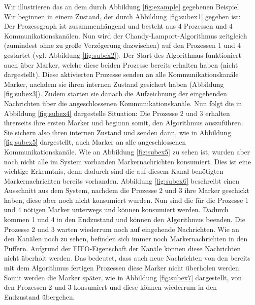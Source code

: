 \documentclass[a4paper,
12pt,
BCOR12mm,
]{scrartcl}
\theoremstyle{break}
\begin{document}
Wir illustrieren das an dem durch Abbildung \ref{fig:example} gegebenen Beispiel. Wir
beginnen in einem Zustand, der durch Abbildung \ref{fig:subex1} gegeben ist: Der
Prozessgraph ist zusammenhängend und besteht aus 4 Prozessen und 4 Kommunikationskanälen.
Nun wird der Chandy-Lamport-Algorithmus zeitgleich (zumindest ohne zu große Verzögerung
dazwischen) auf den Prozessen 1 und 4 gestartet (vgl. Abbildung \ref{fig:subex2}). Der
Start des Algorithmus funktioniert auch über Marker, welche diese beiden Prozesse bereits
erhalten haben (nicht dargestellt). Diese aktivierten Prozesse senden an alle
Kommunikationskanäle Marker, nachdem sie ihren internen Zustand gesichert haben (Abbildung
\ref{fig:subex3}). Zudem starten sie danach die Aufzeichnung der eingehenden Nachrichten
über die angeschlossenen Kommunikationskanäle. Nun folgt die in Abbildung \ref{fig:subex4}
dargestelle Situation: Die Prozesse 2 und 3 erhalten ihrerseits ihre ersten Marker und
beginnn somit, den Algorithmus auszuführen. Sie sichern also ihren internen Zustand und
senden dann, wie in Abbildung \ref{fig:subex5} dargestellt, auch Marker an alle
angeschlossenen Kommunikationskanäle. Wie an Abbildung \ref{fig:subex5} zu sehen ist,
wurden aber noch nicht alle im System vorhanden Markernachrichten konsumiert. Dies ist
eine wichtige Erkenntnis, denn dadurch sind die auf diesem Kanal benötigten
Markernachrichten bereits vorhanden. Abbildung \ref{fig:subex6} beschreibt einen
Ausschnitt aus dem System, nachdem die Prozesse 2 und 3 ihre Marker geschickt haben, diese
aber noch nicht konsumiert wurden. Nun sind die für die Prozesse 1 und 4 nötigen Marker
unterwegs und können konsumiert werden. Dadurch kommen 1 und 4 in den Endzustand und
können den Algorithmus beenden. Die Prozesse 2 und 3 warten wiederrum noch auf eingehende
Nachrichten. Wie an den Kanälen noch zu sehen, befinden sich immer noch Markernachrichten
in den Puffern. Aufgrund der FIFO-Eigenschaft der Kanäle können diese Nachrichten nicht
überholt werden. Das bedeutet, dass auch neue Nachrichten von den bereits mit dem
Algorithmus fertigen Prozessen diese Marker nicht überholen werden. Somit werden die
Marker später, wie in Abbildung \ref{fig:subex7} dargestellt,
von den Prozessen 2 und 3 konsumiert und diese können wiederrum in den Endzustand
übergehen.
\end{document}
